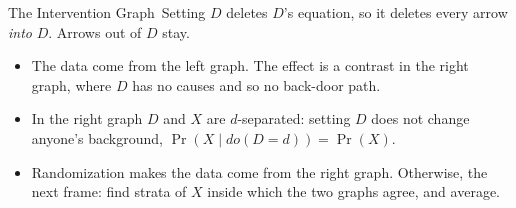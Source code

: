 \documentclass[aspectratio=169,11pt,xcolor=dvipsnames]{beamer}
\newcommand{\adv}{\,\raisebox{0.6pt}{\textcolor{accent}{$\bigstar$}}}
\begin{document}
\begin{frame}{The Intervention Graph\adv}
Setting $D$ deletes $D$'s equation, so it deletes every arrow \emph{into}
$D$. Arrows out of $D$ stay.
\begin{center}
\end{center}
\begin{itemize}\itemsep2pt
  \item The data come from the left graph. The effect is a contrast in the
        right graph, where $D$ has no causes and so no back-door path.
  \item In the right graph $D$ and $X$ are $d$-separated: setting $D$ does
        not change anyone's background, $\Pr(X \mid do(D = d)) = \Pr(X)$.
  \item Randomization makes the data come from the right graph. Otherwise,
        the next frame: find strata of $X$ inside which the two graphs
        agree, and average.
\end{itemize}
\end{frame}
\end{document}
